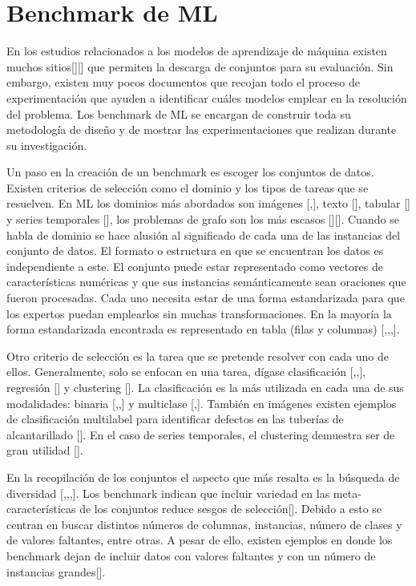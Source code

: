 \section{Benchmark de ML}\label{section:bench_ML}

En los estudios relacionados a los modelos de aprendizaje de máquina existen muchos sitios[\cite{43}][\cite{45}] que permiten la descarga de conjuntos para su evaluación. 
Sin embargo, existen muy pocos documentos que recojan todo el proceso de experimentación que ayuden a identificar cuáles modelos emplear en la resolución del problema. 
Los benchmark de ML se encargan de construir toda su metodología de diseño y de mostrar las experimentaciones que realizan durante su investigación. 

Un paso en la creación de un benchmark es escoger los conjuntos de datos. Existen criterios de selección como el dominio y los tipos de tareas que se resuelven. 
En ML los dominios más abordados son imágenes [\cite{1},\cite{3}], texto [\cite{4}], tabular [\cite{2}] y series temporales [\cite{7}], los problemas de grafo son los más escasos [\cite{5}][\cite{6}]. 
Cuando se habla de dominio se hace alusión al significado de cada una de las instancias del conjunto de datos. El formato o estructura en que se encuentran los datos 
es independiente a este. El conjunto puede estar representado como vectores de características numéricas y que sus instancias semánticamente sean oraciones que fueron 
procesadas. Cada uno necesita estar de una forma estandarizada para que los expertos puedan emplearlos sin muchas transformaciones. En la mayoría la forma estandarizada 
encontrada es representado en tabla (filas y columnas) [\cite{4},\cite{1},\cite{3},\cite{2}].

Otro criterio de selección es la tarea que se pretende resolver con cada uno de ellos. Generalmente, solo se enfocan en una tarea, dígase clasificación 
[\cite{4},\cite{1},\cite{3}], regresión [\cite{6}] y clustering [\cite{7}]. La clasificación es la más utilizada en cada una de sus modalidades: binaria 
[\cite{4},\cite{2},\cite{5}] y multiclase [\cite{2},\cite{5}]. También en imágenes existen ejemplos de clasificación multilabel para identificar 
defectos en las tuberías de alcantarillado [\cite{3}]. En el caso de series temporales, el clustering demuestra ser de gran utilidad [\cite{7}].

En la recopilación de los conjuntos el aspecto que más resalta es la búsqueda de diversidad [\cite{4},\cite{2},\cite{6},\cite{7}]. Los benchmark indican que incluir 
variedad en las meta-características de los conjuntos reduce sesgos de selección[\cite{2}]. Debido a esto se centran en buscar distintos números de columnas, instancias, 
número de clases y de valores faltantes, entre otras. A pesar de ello, existen ejemplos en donde los benchmark dejan de incluir datos con valores faltantes y 
con un número de instancias grandes[\cite{2}].


